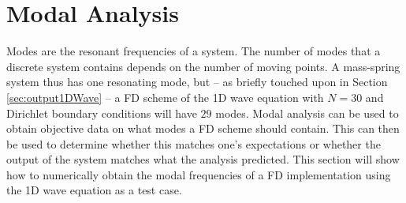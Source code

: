 {{\section{Modal Analysis}
\label{sec:modalAnalysis}
Modes are the resonant frequencies of a system. The number of modes that a discrete system contains depends on the number of moving points. A mass-spring system thus has one resonating mode, but -- as briefly touched upon in Section \ref{sec:output1DWave} -- a FD scheme of the 1D wave equation with $N = 30$ and Dirichlet boundary conditions will have $29$ modes. Modal analysis  can be used to obtain objective data on what modes a FD scheme should contain. This can then be used to determine whether this matches one's expectations or whether the output of the system matches what the analysis predicted. This section will show how to numerically obtain the modal frequencies of a FD implementation using the 1D wave equation as a test case.

}}
